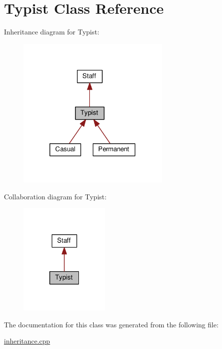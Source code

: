 \hypertarget{class_typist}{}\section{Typist Class Reference}
\label{class_typist}


Inheritance diagram for Typist\+:
\nopagebreak
\begin{figure}[H]
\begin{center}
\leavevmode
\includegraphics[width=210pt]{class_typist__inherit__graph}
\end{center}
\end{figure}


Collaboration diagram for Typist\+:
\nopagebreak
\begin{figure}[H]
\begin{center}
\leavevmode
\includegraphics[width=124pt]{class_typist__coll__graph}
\end{center}
\end{figure}


The documentation for this class was generated from the following file\+:\begin{DoxyCompactItemize}
\item 
\hyperlink{inheritance_8cpp}{inheritance.\+cpp}\end{DoxyCompactItemize}
